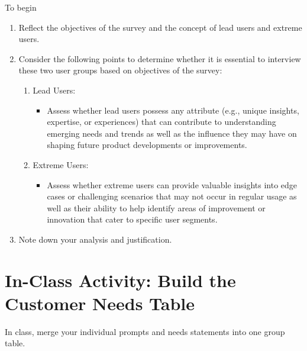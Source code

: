 \smallskip
\noindent
To begin
\begin{enumerate}
    \item Reflect the objectives of the survey and the concept of lead users and extreme users.
    \item Consider the following points to determine whether it is essential to interview these two user groups based on objectives of the survey:
    \begin{enumerate}
        \item Lead Users:
        \begin{itemize}
            \item Assess whether lead users possess any attribute (e.g., unique insights, expertise, or experiences) that can contribute to understanding emerging needs and trends as well as the influence they may have on shaping future product developments or improvements.
        \end{itemize}
        \item Extreme Users:
        \begin{itemize}
            \item Assess whether extreme users can provide valuable insights into edge cases or challenging scenarios that may not occur in regular usage as well as their ability to help identify areas of improvement or innovation that cater to specific user segments.
        \end{itemize}
    \end{enumerate}
    \item Note down your analysis and justification.
\end{enumerate}



\section{In-Class Activity: Build the Customer Needs Table}

In class, merge your individual prompts and needs statements into one group table.

